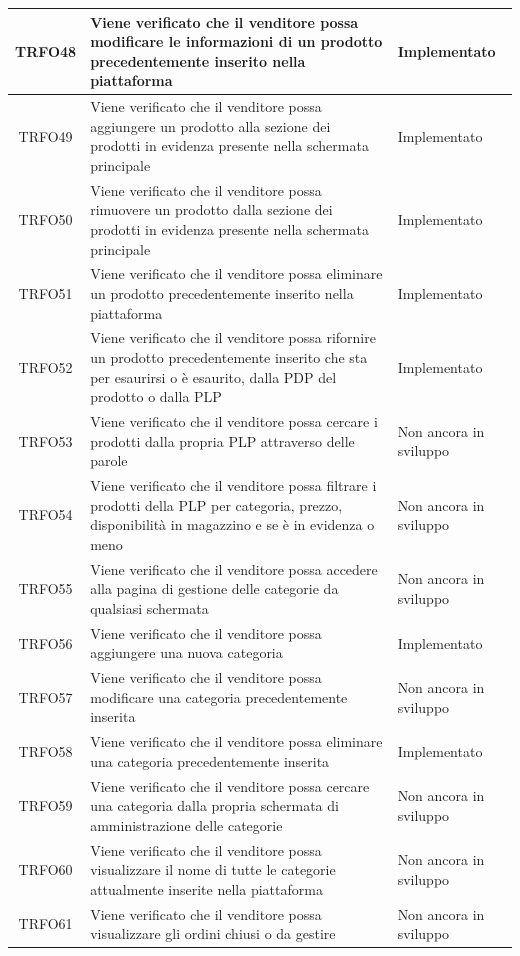 \begin{longtable}{|c| C{10cm} |C{3cm}|}
    	TRFO48 & Viene verificato che il venditore possa modificare le informazioni di un prodotto precedentemente inserito nella piattaforma & Implementato\\ \hline
    	TRFO49 & Viene verificato che il venditore possa aggiungere un prodotto alla sezione dei prodotti in evidenza presente nella schermata principale & Implementato\\ \hline
    	TRFO50 & Viene verificato che il venditore possa rimuovere un prodotto dalla sezione dei prodotti in evidenza  presente nella schermata principale & Implementato\\ \hline
    	TRFO51 & Viene verificato che il venditore possa eliminare un prodotto precedentemente inserito nella piattaforma & Implementato\\ \hline
    	TRFO52 & Viene verificato che il venditore possa rifornire un prodotto precedentemente inserito che sta per esaurirsi o è esaurito, dalla PDP del prodotto o dalla PLP & Implementato\\ \hline
   	TRFO53 & Viene verificato che il venditore possa cercare i prodotti dalla propria PLP attraverso delle parole & Non ancora in sviluppo\\ \hline
    	TRFO54 & Viene verificato che il venditore possa filtrare i prodotti della PLP per categoria, prezzo, disponibilità in magazzino e se è in evidenza o meno & Non ancora in sviluppo\\ \hline
	TRFO55 & Viene verificato che il venditore possa accedere alla pagina di gestione delle categorie da qualsiasi schermata & Non ancora in sviluppo\\ \hline
    	TRFO56 & Viene verificato che il venditore possa aggiungere una nuova categoria & Implementato\\ \hline
    	TRFO57 & Viene verificato che il venditore possa modificare una categoria precedentemente inserita & Non ancora in sviluppo\\ \hline
   	TRFO58 & Viene verificato che il venditore possa eliminare una categoria precedentemente inserita & Implementato\\ \hline
    	TRFO59 & Viene verificato che il venditore possa cercare una categoria dalla propria schermata di amministrazione delle categorie & Non ancora in sviluppo\\ \hline
	TRFO60 & Viene verificato che il venditore possa visualizzare il nome di tutte le categorie attualmente inserite nella piattaforma & Non ancora in sviluppo\\ \hline
	TRFO61 & Viene verificato che il venditore possa visualizzare gli ordini chiusi o da gestire & Non ancora in sviluppo\\ \hline

\end{longtable}
